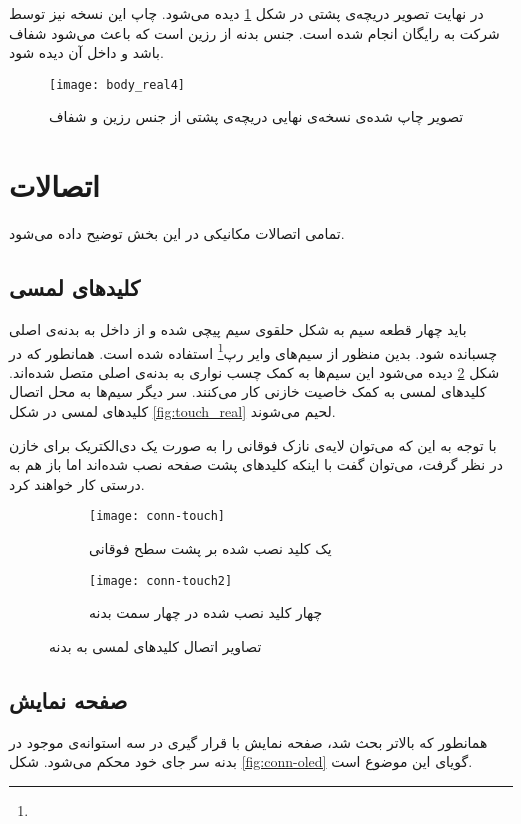 در نهایت تصویر دریچه‌ی پشتی در شکل \ref{fig:body-back-reel} دیده می‌شود. چاپ این نسخه نیز توسط شرکت \cite{PCBWay} به رایگان انجام شده است. جنس بدنه از رزین است که باعث می‌شود شفاف باشد و داخل آن دیده شود.

	\begin{figure}[h]
		\centering
		\texttt{[image: body\_real4]}
		\caption{تصویر چاپ شده‌ی نسخه‌ی نهایی دریچه‌ی پشتی از جنس رزین و شفاف}
		\label{fig:body-back-reel}
	\end{figure}

\section{اتصالات}
 تمامی اتصالات مکانیکی در این بخش توضیح داده می‌شود.
 
 \subsection{کلیدهای لمسی}
 باید چهار قطعه سیم به شکل حلقوی سیم پیچی شده و از داخل به بدنه‌ی اصلی چسبانده شود. بدین منظور از سیم‌های وایر رپ\footnote{} استفاده شده است. همانطور که در شکل \ref{fig:conn-touch} دیده می‌شود این سیم‌ها به کمک چسب نواری به بدنه‌ی اصلی متصل شده‌اند. کلیدهای لمسی به کمک خاصیت خازنی کار می‌کنند. سر دیگر سیم‌ها به محل اتصال کلیدهای لمسی در شکل \ref{fig:touch_real} لحیم می‌شوند.
 
با توجه به این که می‌توان لایه‌ی نازک فوقانی را به صورت یک دی‌الکتریک برای خازن در نظر گرفت، می‌توان گفت با اینکه کلیدهای پشت صفحه نصب شده‌اند اما باز هم به درستی کار خواهند کرد. 

	\begin{figure}[h]
		\centering
		\begin{subfigure}{0.45\textwidth}
			\centering
			\texttt{[image: conn-touch]}
			\caption{یک کلید نصب شده بر پشت سطح فوقانی}
		\end{subfigure} 
		\begin{subfigure}{0.45\textwidth}
			\centering
			\texttt{[image: conn-touch2]}
			\caption{چهار کلید نصب شده در چهار سمت بدنه}
		\end{subfigure}
		\caption{تصاویر اتصال کلیدهای لمسی به بدنه}
		\label{fig:conn-touch}
	\end{figure}

\subsection{صفحه نمایش}
همانطور که بالاتر بحث شد، صفحه نمایش با قرار گیری در سه استوانه‌ی موجود در بدنه سر جای خود محکم می‌شود. شکل \ref{fig:conn-oled} گویای این موضوع است.


